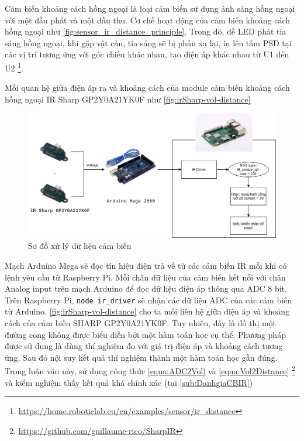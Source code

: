 Cảm biến khoảng cách hồng ngoại là loại cảm biến sử dụng ánh sáng hồng ngoại với một đầu phát và một đầu thu. Cơ chế hoạt động của cảm biến khoảng cách hồng ngoại như \figurename{ \ref{fig:sensor_ir_distance_principle}}. Trong đó, đề LED phát tia sáng hồng ngoại, khi gặp vật cản, tia sáng sẽ bị phản xạ lại, in lên tấm PSD tại các vị trí tương ứng với góc chiếu khác nhau, tạo điện áp khác nhau từ U1 đến U2 \footnote{\url{https://home.roboticlab.eu/en/examples/sensor/ir_distance}}.

Mối quan hệ giữa điện áp ra và khoảng cách của module cảm biến khoảng cách hồng ngoại IR Sharp GP2Y0A21YK0F như \figurename{ \ref{fig:irSharp-vol-distance}}

\begin{figure}[htbp]
    \centering
    \includegraphics[width=\linewidth]{figures/ir_safety_controller-dataProcessing.png}
    \caption{Sơ đồ xử lý dữ liệu cảm biến}
    \label{fig:workflow-dataProcessing}
\end{figure}

Mạch Arduino Mega sẽ đọc tín hiệu điện trả về từ các cảm biến IR mỗi khi có lệnh yêu cầu từ Raspberry Pi. Mỗi chân dữ liệu của cảm biến kết nối với chân Analog input trên mạch Arduino để đọc dữ liệu điện áp thông qua ADC 8 bit.
Trên Raspberry Pi, {\tt node ir\_driver} sẽ nhận các dữ liệu ADC của các cảm biến từ Arduino. \figurename{ \ref{fig:irSharp-vol-distance}} cho ta mối liên hệ giữa điện áp và khoảng cách của cảm biến SHARP GP2Y0A21YK0F. Tuy nhiên, đây là đồ thị một đường cong không được biểu diễn bởi một hàm toán học cụ thể. Phương pháp được sử dụng là dùng thí nghiệm đo với giá trị điện áp và khoảng cách tương ứng. Sau đó nội suy kết quả thí nghiệm thành một hàm toán học gần đúng. Trong luận văn này, sử dụng công thức \ref{equa:ADC2Vol} và \ref{equa:Vol2Distance} \footnote{\url{https://github.com/guillaume-rico/SharpIR}} và kiểm nghiệm thấy kết quả khá chính xác (tại \ref{sub:DanhgiaCBIR})


